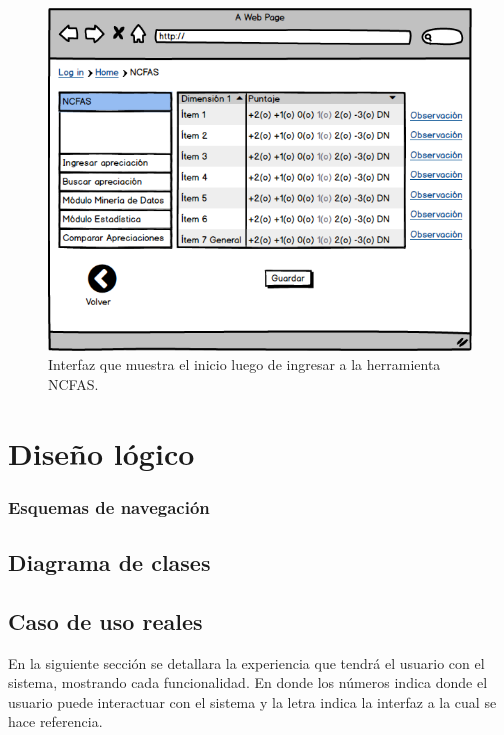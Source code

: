 \begin{figure}[htb]
	\label{itmncfas2}
	\begin{center}
		\includegraphics[scale=0.5]{imagenes/itmncfas.png}
	\end{center}
	\caption{Interfaz que muestra el inicio luego de ingresar a la herramienta NCFAS.}
\end{figure}

\clearpage
\newpage

\section{Diseño lógico} \label{disenolog}



\subsubsection{Esquemas de navegación}

\clearpage
\newpage

\subsection{Diagrama de clases}

\clearpage
\newpage

\subsection{Caso de uso reales}

En la siguiente sección se detallara la experiencia que tendrá el usuario con el sistema, mostrando cada funcionalidad. En donde los números indica donde el usuario puede interactuar con el sistema y la letra indica la interfaz a la cual se hace referencia.\\

